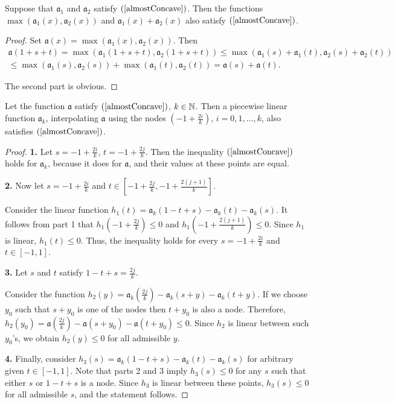 \begin{lm}
\label{maxSumConcave}
Suppose that $\mathfrak a_1$ and $\mathfrak a_2$ satisfy $(\ref{almostConcave})$.
Then the functions $\max (\mathfrak a_1(x), \mathfrak a_2(x))$ and $\mathfrak a_1(x) + \mathfrak a_2(x)$ also satisfy $(\ref{almostConcave})$.
\end{lm}
\begin{proof}
Set $\mathfrak a(x) = \max (\mathfrak a_1(x), \mathfrak a_2(x))$. Then
\begin{multline*}
\mathfrak a(1 + s + t) = \max(\mathfrak a_1( 1 + s + t), \mathfrak a_2(1 + s + t)) \le
\max(\mathfrak a_1(s) + \mathfrak a_1(t), \mathfrak a_2(s) + \mathfrak a_2(t)) \\
\le \max(\mathfrak a_1(s), \mathfrak a_2(s)) + \max(\mathfrak a_1(t), \mathfrak a_2(t)) =
\mathfrak a(s) + \mathfrak a(t).
\end{multline*}

The second part is obvious.
\end{proof}

\begin{lm}
\label{piecewiseLinearConcave}
Let the function $\mathfrak a$ satisfy $(\ref{almostConcave})$, $k \in \mathbb N$.
Then a piecewise linear function $\mathfrak a_k$,
interpolating $\mathfrak a$ using the nodes
$(-1 + \frac{2i}{k})$, $i = 0, 1, \dots, k$,
also satisfies $(\ref{almostConcave})$.
\end{lm}
\begin{proof}
{\bf 1.}
Let $s = -1 + \frac{2i}{k}$, $t = -1 + \frac{2j}{k}$.
Then the inequality $(\ref{almostConcave})$ holds for $\mathfrak a_k$, because it does for $\mathfrak a$,
and their values at these points are equal.

{\bf 2.}
Now let $s = -1 + \frac{2i}{k}$ and $t \in [-1 + \frac{2j}{k}, -1 + \frac{2(j + 1)}{k}]$.

Consider the linear function $h_1(t) = \mathfrak a_k( 1 - t + s ) - \mathfrak a_k(t) - \mathfrak a_k(s)$.
It follows from part 1 that $h_1(-1 + \frac{2j}{k}) \le 0$ and $h_1(-1 + \frac{2(j + 1)}{k}) \le 0$.
Since $h_1$ is linear, $h_1(t) \le 0$.
Thus, the inequality holds for every $s = -1 + \frac{2i}{k}$ and $t \in [-1, 1]$.

{\bf 3.}
Let $s$ and $t$ satisfy $1 - t + s = \frac{2j}{k}$.

Consider the function $h_2(y) = \mathfrak a_k(\frac{2j}{k}) - \mathfrak a_k(s + y) - \mathfrak a_k(t + y)$.
If we choose $y_0$ such that $s + y_0$ is one of the nodes then $t + y_0$ is also a node.
Therefore, $h_2(y_0) = \mathfrak a(\frac{2j}{k}) - \mathfrak a(s + y_0) - \mathfrak a(t + y_0) \le 0$.
Since $h_2$ is linear between such $y_0$'s, we obtain $h_2(y) \le 0$ for all admissible $y$.

{\bf 4.}
Finally, consider $h_3(s) = \mathfrak a_k( 1 - t + s ) - \mathfrak a_k(t) - \mathfrak a_k(s)$ for arbitrary given $t \in [-1, 1]$.
Note that parts 2 and 3 imply $h_3(s) \le 0$ for any $s$
such that either $s$ or $1 - t + s$ is a node.
Since $h_3$ is linear between these points, $h_3(s) \le 0$ for all admissible $s$,
and the statement follows.
\end{proof}

